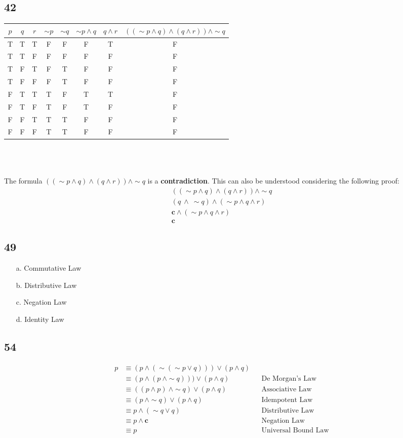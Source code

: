 \documentclass[12pt]{article}
\begin{document}
\subsection*{42}

\begin{tabular}{c c c|c c|c|c|c}
    $p$ & $q$ & $r$ & $\sim p$ & $\sim q$ & $\sim p \wedge q$ & $q \wedge r$ & $((\sim p \wedge q)\wedge(q \wedge r))\wedge \sim q$ \\
    \hline
    T&T&T&F&F&F&T&F \\
    T&T&F&F&F&F&F&F \\
    T&F&T&F&T&F&F&F \\
    T&F&F&F&T&F&F&F \\
    F&T&T&T&F&T&T&F \\
    F&T&F&T&F&T&F&F \\
    F&F&T&T&T&F&F&F \\
    F&F&F&T&T&F&F&F \\
\end{tabular}
\\ \\ \\
The formula $((\sim p \wedge q)\wedge(q \wedge r))\wedge \sim q$ is a \textbf{contradiction}. This can also be understood considering the following proof:
\begin{align*}
    ((\sim p \wedge q)\wedge(q \wedge r))\wedge \sim q \\
    (q \ \wedge \ \sim q) \wedge (\sim p \wedge q \wedge r) \\
    \textbf{c} \wedge (\sim p \wedge q \wedge r) \\
    \textbf{c}
\end{align*}
\subsection*{49}
\begin{enumerate}
    \item[a.] Commutative Law
    \item[b.] Distributive Law
    \item[c.] Negation Law
    \item[d.] Identity Law
\end{enumerate}
\subsection*{54}
\begin{align*}
    p &\equiv (p \wedge (\sim(\sim p \vee q)))\vee(p \wedge q) \\
    &\equiv (p \wedge (p \ \wedge \sim q)))\vee(p \wedge q) && \text{De Morgan's Law}\\
    &\equiv ((p \wedge p) \ \wedge \sim q)\vee(p \wedge q) && \text{Associative Law}\\
    &\equiv (p \ \wedge \sim q)\vee(p \wedge q) && \text{Idempotent Law}\\
    &\equiv p \wedge (\sim q \vee q) && \text{Distributive Law}\\
    &\equiv p \wedge \textbf{c} && \text{Negation Law}\\
    &\equiv p && \text{Universal Bound Law}
\end{align*}
\end{document}
